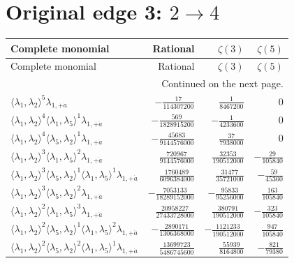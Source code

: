 \section{Original edge 3: $2\to 4$}
\begin{longtable}{@{}lrrr@{}}
\toprule
Complete monomial & Rational & $\zeta(3)$ & $\zeta(5)$ \\
\midrule\endfirsthead
\toprule Complete monomial & Rational & $\zeta(3)$ & $\zeta(5)$ \\
\midrule\endhead
\midrule\multicolumn{4}{r}{Continued on the next page.}\\\endfoot
\bottomrule\endlastfoot
$\langle\lambda_1,\lambda_2\rangle^{5}\lambda_{1,+\dot a}$ & $-\frac{17}{114307200}$ & $\frac{1}{8467200}$ & $0$ \\
$\langle\lambda_1,\lambda_2\rangle^{4}\langle\lambda_1,\lambda_5\rangle^{1}\lambda_{1,+\dot a}$ & $-\frac{569}{1828915200}$ & $-\frac{1}{4233600}$ & $0$ \\
$\langle\lambda_1,\lambda_2\rangle^{4}\langle\lambda_5,\lambda_2\rangle^{1}\lambda_{1,+\dot a}$ & $-\frac{45683}{9144576000}$ & $\frac{37}{7938000}$ & $0$ \\
$\langle\lambda_1,\lambda_2\rangle^{3}\langle\lambda_1,\lambda_5\rangle^{2}\lambda_{1,+\dot a}$ & $\frac{720967}{9144576000}$ & $\frac{32353}{190512000}$ & $-\frac{29}{105840}$ \\
$\langle\lambda_1,\lambda_2\rangle^{3}\langle\lambda_5,\lambda_2\rangle^{1}\langle\lambda_1,\lambda_5\rangle^{1}\lambda_{1,+\dot a}$ & $\frac{1760489}{6096384000}$ & $\frac{31477}{35721000}$ & $-\frac{59}{45360}$ \\
$\langle\lambda_1,\lambda_2\rangle^{3}\langle\lambda_5,\lambda_2\rangle^{2}\lambda_{1,+\dot a}$ & $-\frac{7053133}{18289152000}$ & $-\frac{95833}{95256000}$ & $\frac{163}{105840}$ \\
$\langle\lambda_1,\lambda_2\rangle^{2}\langle\lambda_1,\lambda_5\rangle^{3}\lambda_{1,+\dot a}$ & $\frac{20958227}{27433728000}$ & $\frac{380791}{190512000}$ & $-\frac{323}{105840}$ \\
$\langle\lambda_1,\lambda_2\rangle^{2}\langle\lambda_5,\lambda_2\rangle^{1}\langle\lambda_1,\lambda_5\rangle^{2}\lambda_{1,+\dot a}$ & $-\frac{2890171}{1306368000}$ & $-\frac{1121233}{190512000}$ & $\frac{947}{105840}$ \\
$\langle\lambda_1,\lambda_2\rangle^{2}\langle\lambda_5,\lambda_2\rangle^{2}\langle\lambda_1,\lambda_5\rangle^{1}\lambda_{1,+\dot a}$ & $\frac{13699723}{5486745600}$ & $\frac{55939}{8164800}$ & $-\frac{821}{79380}$ \\

\end{longtable}

